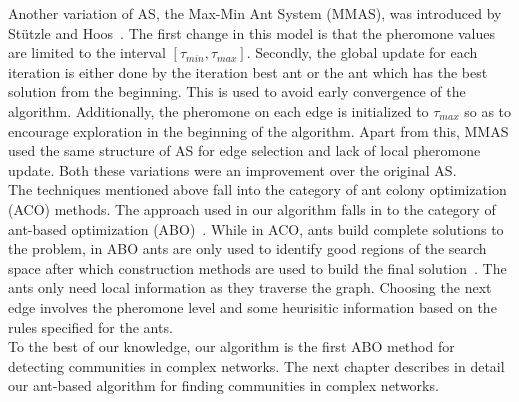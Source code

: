 \begin{spacing}{1.5}
\indent Another variation of AS, the Max-Min Ant System (MMAS), was introduced by St{\"u}tzle and Hoos~\cite{Stützle2000889}. The first change in this model is that the pheromone values are limited to the interval $[\tau_{min}, \tau_{max}]$. Secondly, the global update for each iteration is either done by the iteration best ant or the ant which has the best solution from the beginning. This is used to avoid early convergence of the algorithm. Additionally, the pheromone on each edge is initialized to $\tau_{max}$ so as to encourage exploration in the beginning of the algorithm. Apart from this, MMAS used the same structure of AS for edge selection and lack of local pheromone update. Both these variations were an improvement over the original AS.\\
\indent The techniques mentioned above fall into the category of ant colony optimization (ACO) methods. The approach used in our algorithm falls in to the category of ant-based optimization (ABO)~\cite{Bui:2009:PSM:1569901.1569903}. While in ACO, ants build complete solutions to the problem, in ABO ants are only used to identify good regions of the search space after which construction methods are used to build the final solution~\cite{5910378}. The ants only need local information as they traverse the graph. Choosing the next edge involves the pheromone level and some heurisitic information based on the rules specified for the ants.\\
\indent To the best of our knowledge, our algorithm is the first ABO method for detecting communities in complex networks. The next chapter describes in detail our ant-based algorithm for finding communities in complex networks.
\end{spacing}